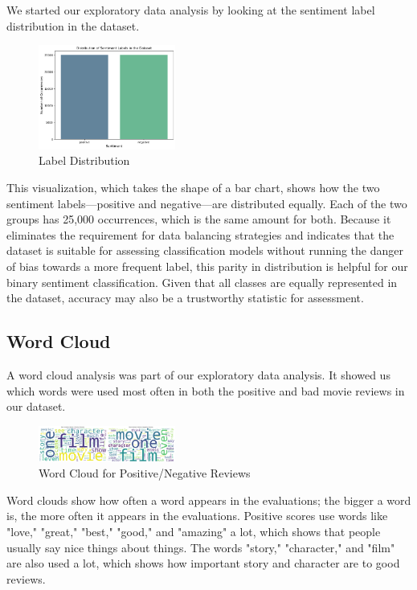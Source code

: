 \documentclass[11pt,a4paper]{article}
\begin{document}
We started our exploratory data analysis by looking at the sentiment label distribution in the dataset. 

\begin{figure}[h]
    \centering
    \includegraphics[width=0.4\textwidth]{3.png}
    \caption{Label Distribution}
    \label{fig:polarity_distribution}
\end{figure}


This visualization, which takes the shape of a bar chart, shows how the two sentiment labels—positive and negative—are distributed equally. Each of the two groups has 25,000 occurrences, which is the same amount for both. Because it eliminates the requirement for data balancing strategies and indicates that the dataset is suitable for assessing classification models without running the danger of bias towards a more frequent label, this parity in distribution is helpful for our binary sentiment classification. Given that all classes are equally represented in the dataset, accuracy may also be a trustworthy statistic for assessment.

\subsection{Word Cloud}
A word cloud analysis was part of our exploratory data analysis. It showed us which words were used most often in both the positive and bad movie reviews in our dataset.


\begin{figure}[h]
    \centering
    \includegraphics[width=0.4\textwidth]{4.png}
    \caption{Word Cloud for Positive/Negative Reviews}
    \label{fig:polarity_distribution}
\end{figure}

Word clouds show how often a word appears in the evaluations; the bigger a word is, the more often it appears in the evaluations. Positive scores use words like "love," "great," "best," "good," and "amazing" a lot, which shows that people usually say nice things about things. The words "story," "character," and "film" are also used a lot, which shows how important story and character are to good reviews.
\end{document}

